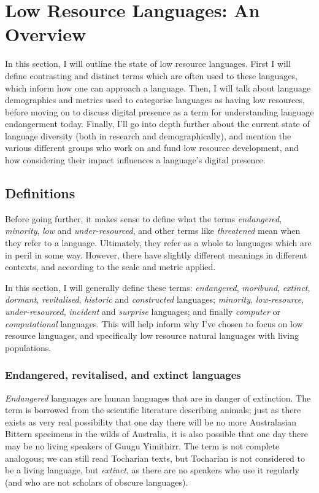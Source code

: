 \section{Low Resource Languages: An Overview}\label{sec:endlang}

In this section, I will outline the state of low resource languages. First I will define contrasting and distinct terms which are often used to these languages, which inform how one can approach a language. Then, I will talk about language demographics and metrics used to categorise languages as having low resources, before moving on to discuss digital presence as a term for understanding language endangerment today. Finally, I'll go into depth further about the current state of language diversity (both in research and demographically), and mention the various different groups who work on and fund low resource development, and how considering their impact influences a language's digital presence.

\subsection{Definitions}

Before going further, it makes sense to define what the terms \emph{endangered}, \emph{minority}, \emph{low} and \emph{under-resourced}, and other terms like \emph{threatened} mean when they refer to a language. Ultimately, they refer as a whole to languages which are in peril in some way. However, there have slightly different meanings in different contexts, and according to the scale and metric applied.

In this section, I will generally define these terms: \textit{endangered}, \textit{moribund},  \textit{extinct}, \textit{dormant}, \textit{revitalised}, \textit{historic} and  \textit{constructed} languages; \textit{minority}, \textit{low-resource}, \textit{under-resourced}, \textit{incident} and \textit{surprise} languages; and finally \textit{computer} or \textit{computational} languages. This will help inform why I've chosen to focus on low resource languages, and specifically low resource natural languages with living populations.

\subsubsection{Endangered, revitalised, and extinct languages}

\emph{Endangered} languages are human languages that are in danger of extinction. The term is borrowed from the scientific literature describing animals; just as there exists as very real possibility that one day there will be no more Australasian Bittern specimens in the wilds of Australia, it is also possible that one day there may be no living speakers of Guugu Yimithirr. The term is not complete analogous; we can still read Tocharian texts, but Tocharian is not considered to be a living language, but \textit{extinct}, as there are no speakers who use it regularly (and who are not scholars of obscure languages).

